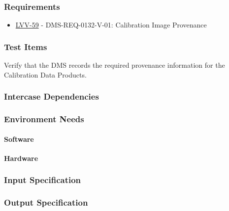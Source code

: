 \subsubsection{Requirements}
\begin{itemize}
\item \href{https://jira.lsstcorp.org/browse/LVV-59}{LVV-59} - DMS-REQ-0132-V-01: Calibration Image Provenance
\end{itemize}

\subsubsection{Test Items}
Verify that the DMS records the required provenance information for the
Calibration Data Products.



\subsubsection{Intercase Dependencies}

\subsubsection{Environment Needs}

\paragraph{Software}

\paragraph{Hardware}

\subsubsection{Input Specification}

\subsubsection{Output Specification}

